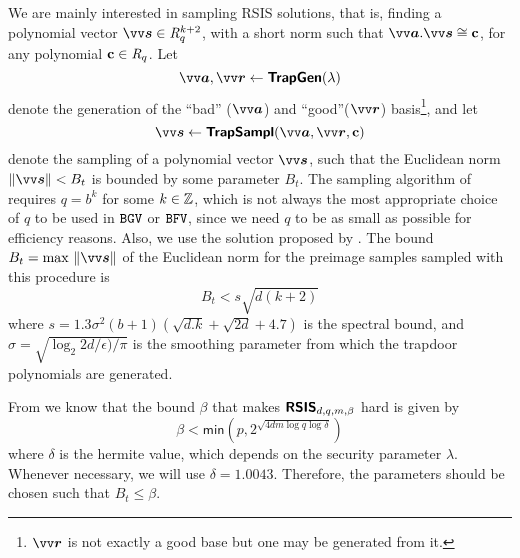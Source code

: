 We are mainly interested in sampling RSIS solutions, that is, finding a polynomial vector $\pv{s} \in \intring_q^{k+2}$, with a short norm such that $\pv{a}.\pv{s}\cong \pc$, for any polynomial $\mathbf{c} \in \mathit{R}_q$. Let
\[\pv{a},\pv{r} \from \bkw{TrapGen}(\lambda)\]
denote the generation of the ``bad'' ($\pv{a}$) and ``good''($\pv{r}$) basis\footnote{$\pv{r}$ is not exactly a good base but one may be generated from it.}, and let
\[\pv{s}\from \bkw{TrapSampl}(\pv{a},\pv{r},\pc)\]
denote the sampling of a polynomial vector $\pv{s}$, such that the Euclidean norm $\|\pv{s}\|<B_t$ is bounded by some parameter $B_t$. The sampling algorithm of \cite{micciancioTrapdoorsLatticesSimpler2012}
requires $q=b^k$ for some $k \in \mathbb{Z}$, which is not always the most appropriate choice of $q$ to be used in $\mathtt{BGV}$ or $\mathtt{BFV}$, since we need $q$ to be as small as possible for efficiency reasons. Also, we use the solution proposed by \cite{cousinsImplementingConjunctionObfuscation2018}. The bound $B_t=\textrm{max } \|\pv{s}\|$ of the Euclidean norm for the preimage samples sampled with this procedure is 
\begin{equation}\label{eq:bound}
    B_t<s\sqrt{d(k+2)}
\end{equation}
where $s=1.3\sigma^2(b+1)(\sqrt{d.k}+\sqrt{2d}+4.7)$ is the spectral bound, and $\sigma=\sqrt{\log_2{2d/\epsilon)}/\pi}$ is the smoothing parameter from which the trapdoor polynomials are generated. 

From \cite{micciancioLatticebasedCryptography2009} we know that the bound $\beta$ that makes $\textsf{\textbf{RSIS}}_{d,q,m,\beta}$ hard is given by
\begin{equation}\label{eq:rsisbound}
\beta < \textsf{min}(p,2^{\sqrt{4dm\log{q}\log{\delta}}})
\end{equation}
where $\delta$ is the hermite value, which depends on the security parameter $\lambda$. Whenever necessary, we will use $\delta=1.0043$. Therefore, the parameters should be chosen such that $B_t \leq \beta$.